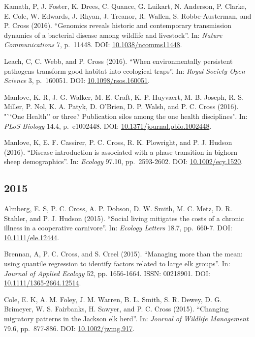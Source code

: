 \documentclass[12pt,]{article}
\begin{document}
Kamath, P, J. Foster, K. Drees, C. Quance, G. Luikart, N. Anderson, P.
Clarke, E. Cole, W. Edwards, J. Rhyan, J. Treanor, R. Wallen, S.
Robbe-Austerman, and P. Cross (2016). ``Genomics reveals historic and
contemporary transmission dynamics of a bacterial disease among wildlife
and livestock''. In: \emph{Nature Communications} 7, p.~11448. DOI:
\href{https://doi.org/10.1038\%2Fncomms11448}{10.1038/ncomms11448}.

Leach, C, C. Webb, and P. Cross (2016). ``When environmentally
persistent pathogens transform good habitat into ecological traps''. In:
\emph{Royal Society Open Science} 3, p.~160051. DOI:
\href{https://doi.org/10.1098\%2Frsos.160051}{10.1098/rsos.160051}.

Manlove, K. R, J. G. Walker, M. E. Craft, K. P. Huyvaert, M. B. Joseph,
R. S. Miller, P. Nol, K. A. Patyk, D. O'Brien, D. P. Walsh, and P. C.
Cross (2016). "``One Health'' or three? Publication silos among the one
health disciplines". In: \emph{PLoS Biology} 14.4, p.~e1002448. DOI:
\href{https://doi.org/10.1371\%2Fjournal.pbio.1002448}{10.1371/journal.pbio.1002448}.

Manlove, K, E. F. Cassirer, P. C. Cross, R. K. Plowright, and P. J.
Hudson (2016). ``Disease introduction is associated with a phase
transition in bighorn sheep demographics''. In: \emph{Ecology} 97.10,
pp.~2593-2602. DOI:
\href{https://doi.org/10.1002\%2Fecy.1520}{10.1002/ecy.1520}.

\hypertarget{section-4}{%
\subsection{2015}\label{section-4}}

Almberg, E. S, P. C. Cross, A. P. Dobson, D. W. Smith, M. C. Metz, D. R.
Stahler, and P. J. Hudson (2015). ``Social living mitigates the costs of
a chronic illness in a cooperative carnivore''. In: \emph{Ecology
Letters} 18.7, pp.~660-7. DOI:
\href{https://doi.org/10.1111\%2Fele.12444}{10.1111/ele.12444}.

Brennan, A, P. C. Cross, and S. Creel (2015). ``Managing more than the
mean: using quantile regression to identify factors related to large elk
groups''. In: \emph{Journal of Applied Ecology} 52, pp. 1656-1664. ISSN:
00218901. DOI:
\href{https://doi.org/10.1111\%2F1365-2664.12514}{10.1111/1365-2664.12514}.

Cole, E. K, A. M. Foley, J. M. Warren, B. L. Smith, S. R. Dewey, D. G.
Brimeyer, W. S. Fairbanks, H. Sawyer, and P. C. Cross (2015). ``Changing
migratory patterns in the Jackson elk herd''. In: \emph{Journal of
Wildlife Management} 79.6, pp.~877-886. DOI:
\href{https://doi.org/10.1002\%2Fjwmg.917}{10.1002/jwmg.917}.
\end{document}
